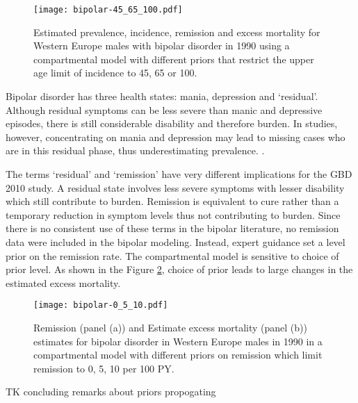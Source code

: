     \begin{figure}[h]
        \begin{center}
            \texttt{[image: bipolar-45\_65\_100.pdf]}
            \caption{Estimated prevalence, incidence, remission and
              excess mortality for Western Europe males with bipolar
              disorder in 1990 using a compartmental model with
              different priors that restrict the upper age limit of
              incidence to 45, 65 or 100.}
            \label{fig:app-bipolar onset}
        \end{center}
    \end{figure}

Bipolar disorder has three health states: mania, depression and
`residual'.  Although residual symptoms can be less severe than manic
and depressive episodes, there is still considerable disability and
therefore burden.  In studies, however, concentrating on mania and
depression may lead to missing cases who are in this residual phase,
thus underestimating prevalence. \cite{angst_historical_2000}.

The terms `residual' and `remission' have very different implications
for the GBD 2010 study.  A residual state involves less severe
symptoms with lesser disability which still contribute to
burden. Remission is equivalent to cure rather than a temporary
reduction in symptom levels thus not contributing to burden. Since
there is no consistent use of these terms in the bipolar literature,
no remission data were included in the bipolar modeling. Instead,
expert guidance set a level prior on the remission rate.  The
compartmental model is sensitive to choice of prior level.  As shown
in the Figure \ref{fig:app-bipolar remission}, choice of prior leads
to large changes in the estimated excess mortality.

    \begin{figure}[h]
        \begin{center}
            \texttt{[image: bipolar-0\_5\_10.pdf]}
            \caption{Remission (panel (a)) and Estimate excess
              mortality (panel (b)) estimates for bipolar disorder in
              Western Europe males in 1990 in a compartmental model
              with different priors on remission which limit remission
              to 0, 5, 10 per 100 PY.}
            \label{fig:app-bipolar remission}
        \end{center}
    \end{figure}

TK concluding remarks about priors propogating